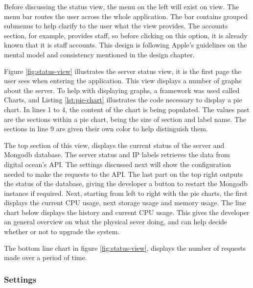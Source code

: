 Before discussing the status view, the menu on the left will exist on view. The menu bar routes the user across the whole application. The bar contains grouped submenus to help clarify to the user what the view provides. The accounts section, for example, provides staff, so before clicking on this option, it is already known that it is staff accounts. This design is following Apple's guidelines on the mental model and consistency mentioned in the design chapter.

Figure \ref{fig:status-view} illustrates the server status view, it is the first page the user sees when entering the application. This view displays a number of graphs about the server. To help with displaying graphs, a framework was used called Charts, and Listing \ref{lst:pie-chart} illustrates the code necessary to display a pie chart. In lines 1 to 4, the content of the chart is being populated. The values past are the sections within a pie chart, being the size of section and label name. The sections in line 9 are given their own color to help distinguish them.

The top section of this view, displays the current status of the server and Mongodb database. The server status and IP labels retrieves the data from digital ocean's API. The settings discussed next will show the configuration needed to make the requests to the API. The last part on the top right outputs the status of the database, giving the developer a button to restart the Mongodb instance if required. Next, starting from left to right with the pie charts, the first displays the current CPU usage, next storage usage and memory usage. The line chart below displays the history and current CPU usage. This gives the developer an general overview on what the physical sever doing, and can help decide whether or not to upgrade the system.




The bottom line chart in figure \ref{fig:status-view}, displays the number of requests made over a period of time.

\subsubsection{Settings}

